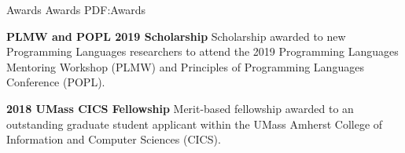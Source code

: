 \Section
{Awards}
{Awards}
{PDF:Awards}

\Entry
\textbf{PLMW and POPL 2019 Scholarship}
\dotfill
\textbf{}
\Gap
Scholarship awarded to new Programming Languages researchers to attend the 2019 Programming Languages Mentoring Workshop (PLMW) and Principles of Programming Languages Conference (POPL).

\BigGap
\Entry
\textbf{2018 UMass CICS Fellowship}
\dotfill
\textbf{}
\Gap
Merit-based fellowship awarded to an outstanding graduate student applicant within the UMass Amherst College of Information and Computer Sciences (CICS).
